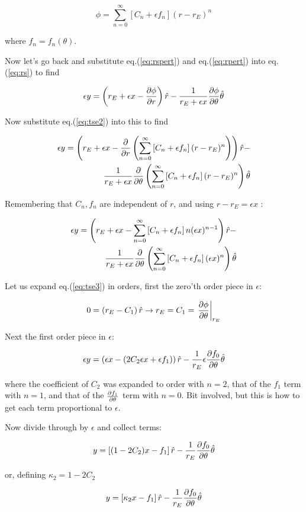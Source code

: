\documentclass{article}
\def\be{\begin{equation}}
\def\ee{\end{equation}}
\def\bea{\begin{eqnarray}}
\def\eea{\end{eqnarray}}
\def\eqref{eq.(\ref}
\def\prtl{\partial}
\newcommand{\eps}{\epsilon}
\newcommand{\rp}{\right)}
\newcommand{\lp}{\left(}
\def\pfpt{ {\prtl f_0 \over \prtl \theta }}
\def \eps {\epsilon}
\begin{document}
\be
\label{eq:tse2}
\phi  = \sum_{n=0}^\infty \left[ C_n + \eps f_n  \right] (r-r_E)^n 
\ee

where $f_n = f_n(\theta)$.

Now let's go back and substitute \eqref{eq:rspert}) and \eqref{eq:rpert}) into \eqref{eq:rs}) to find

\be
\eps y = \lp r_E + \eps x -  {\prtl  \phi \over \prtl r} \rp \hat{r} - {1 \over r_E + \eps x}  {\prtl  \phi \over \prtl \theta} \hat{\theta} 
\ee

Now substitute \eqref{eq:tse2}) into this to find

\bea
\eps y = \lp r_E + \eps x -  {\prtl \over \prtl r} \lp \sum_{n=0}^\infty \left[ C_n + \eps f_n  \right] (r-r_E)^n  \rp \rp \hat{r} - \\
{1 \over r_E + \eps x}  {\prtl  \over \prtl \theta} \lp \sum_{n=0}^\infty \left[ C_n + \eps f_n  \right] (r-r_E)^n  \rp  \hat{\theta} \nonumber
\eea

Remembering that $C_n, f_n$ are independent of $r$, and using $r-r_E = \eps x$ :
 
\bea
\label{eq:tse3}
\eps y = \lp r_E + \eps x -   \sum_{n=0}^\infty \left[ C_n + \eps f_n  \right] n (\eps x)^{n-1}  \rp \hat{r} - \\
{1 \over r_E + \eps x}  {\prtl  \over \prtl \theta} \lp \sum_{n=0}^\infty \left[ C_n + \eps f_n  \right] (\eps x)^n  \rp  \hat{\theta} \nonumber
\eea


Let us expand \eqref{eq:tse3}) in orders, first the zero'th order piece in $\eps$:


\be
0 =  \lp r_E  -C_1 \rp \hat{r} \rightarrow r_E = C_1 = \left. \prtl \phi \over \prtl \theta \right|_{r_E}
\ee


Next the first order piece in $\eps$:


\be
\eps y = \lp \eps x - (2 C_2 \eps x + \eps f_1 ) \rp \hat{r} - {1 \over r_E} \eps {\prtl f_0 \over \prtl \theta } \hat{\theta}
\ee

where the coefficient of $C_2$ was expanded to order with $n=2$, that of the $f_1$ term with $n=1$, and that of the $\prtl f_1 \over \prtl \theta$ term with $n=0$.  Bit involved, but this is how to get each term proportional to $\eps$.

Now divide through by $\eps$ and collect terms:

\be
 y = \left[ (1-2 C_2) x -  f_1 \right] \hat{r} - {1 \over r_E} \pfpt  \hat{\theta}
\ee

or, defining $\kappa_2 = 1-2 C_2$

\be
\label{eq:rsexpanded}
 y = \left[ \kappa_2  x - f_1 \right] \hat{r} - {1 \over r_E}  \pfpt  \hat{\theta}
\ee
\end{document}
